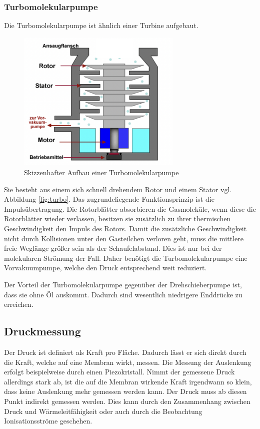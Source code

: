 \subsubsection{Turbomolekularpumpe}
Die Turbomolekularpumpe ist ähnlich einer Turbine aufgebaut.
\begin{figure}[h]
    \centering
    \includegraphics[width=0.7\textwidth]{abb/Turbopumpe.png}
    \caption{Skizzenhafter Aufbau einer Turbomolekularpumpe \cite{turbo}}
    \label{fig:turbo}
\end{figure}
Sie besteht aus einem sich schnell drehendem Rotor und einem Stator vgl. Abbildung \eqref{fig:turbo}.
Das zugrundeliegende Funktionsprinzip ist die Impulsübertragung.
Die Rotorblätter absorbieren die Gasmoleküle, 
wenn diese die Rotorblätter wieder verlassen, besitzen sie zusätzlich zu ihrer thermischen Geschwindigkeit den Impuls des Rotors.
Damit die zusätzliche Geschwindigkeit nicht durch Kollisionen unter den Gasteilchen verloren geht,
muss die mittlere freie Weglänge größer sein als der Schaufelabstand.
Dies ist nur bei der molekularen Strömung der Fall.
Daher benötigt die Turbomolekularpumpe eine Vorvakuumpumpe,
welche den Druck entsprechend weit reduziert.

Der Vorteil der Turbomolekularpumpe gegenüber der Drehschieberpumpe ist,
dass sie ohne Öl auskommt.
Dadurch sind wesentlich niedrigere Enddrücke zu erreichen.


\subsection{Druckmessung}
Der Druck ist definiert als Kraft pro Fläche.
Dadurch lässt er sich direkt durch die Kraft, 
welche auf eine Membran wirkt, messen.
Die Messung der Auslenkung erfolgt beispielweise durch einen Piezokristall.
Nimmt der gemessene Druck allerdings stark ab,
ist die auf die Membran wirkende Kraft irgendwann so klein, 
dass keine Auslenkung mehr gemessen werden kann.
Der Druck muss ab diesen Punkt indirekt gemessen werden.
Dies kann durch den Zusammenhang zwischen Druck und Wärmeleitfähigkeit
oder auch durch die Beobachtung Ionisationsströme geschehen.

